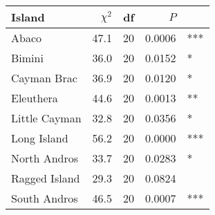 
\begin{tabular}{lrrrl}
\toprule
Island & $\chi^2$ & df & $P$ & \\
\midrule
Abaco & 47.1 & 20 & 0.0006 & ***\\
Bimini & 36.0 & 20 & 0.0152 & *\\
Cayman Brac & 36.9 & 20 & 0.0120 & *\\
Eleuthera & 44.6 & 20 & 0.0013 & **\\
Little Cayman & 32.8 & 20 & 0.0356 & *\\
Long Island & 56.2 & 20 & 0.0000 & ***\\
North Andros & 33.7 & 20 & 0.0283 & *\\
Ragged Island & 29.3 & 20 & 0.0824 & \\
South Andros & 46.5 & 20 & 0.0007 & ***\\
\bottomrule
\end{tabular}
